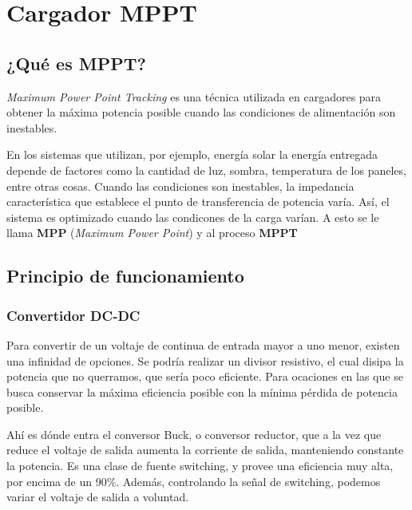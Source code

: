 \chapter{Cargador MPPT}
    
        \section{¿Qué es MPPT?}
        
            \textit{Maximum Power Point Tracking} es una técnica utilizada en cargadores para obtener la máxima potencia posible cuando las condiciones de alimentación son inestables.\par
            En los sistemas que utilizan, por ejemplo, energía solar la energía entregada depende de factores como la cantidad de luz, sombra, temperatura de los paneles, entre otras cosas. Cuando las condiciones son inestables, la impedancia característica que establece el punto de transferencia de potencia varía. Así, el sistema es optimizado cuando las condicones de la carga varían. A esto se le llama \textbf{MPP} (\textit{Maximum Power Point}) y al proceso \textbf{MPPT}\par
            
        \section{Principio de funcionamiento}
        
            \subsection{Convertidor DC-DC}
                Para convertir de un voltaje de continua de entrada mayor a uno menor, existen una infinidad de opciones. Se podría realizar un divisor resistivo, el cual disipa la potencia que no querramos, que sería poco eficiente. Para ocaciones en las que se busca conservar la máxima eficiencia posible con la mínima pérdida de potencia posible.\par
                Ahí es dónde entra el conversor Buck, o conversor reductor, que a la vez que reduce el voltaje de salida aumenta la corriente de salida, manteniendo constante la potencia. Es una clase de fuente switching, y provee una eficiencia muy alta, por encima de un 90\%. Además, controlando la señal de switching, podemos variar el voltaje de salida a voluntad.\par

